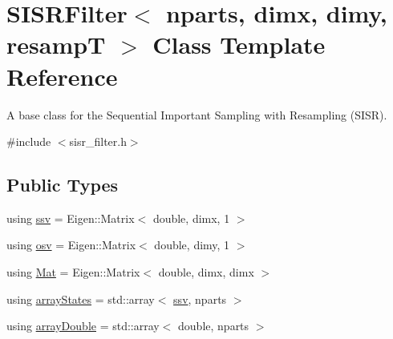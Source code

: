 \hypertarget{classSISRFilter}{}\section{S\+I\+S\+R\+Filter$<$ nparts, dimx, dimy, resampT $>$ Class Template Reference}
\label{classSISRFilter}


A base class for the Sequential Important Sampling with Resampling (S\+I\+SR).  




{\ttfamily \#include $<$sisr\+\_\+filter.\+h$>$}

\subsection*{Public Types}
\begin{DoxyCompactItemize}
\item 
using \hyperlink{classSISRFilter_aeaa3ff0465a0b260710a17238a95212c}{ssv} = Eigen\+::\+Matrix$<$ double, dimx, 1 $>$
\item 
using \hyperlink{classSISRFilter_ad3449fbd43f19dbda6b80459d729d9bf}{osv} = Eigen\+::\+Matrix$<$ double, dimy, 1 $>$
\item 
using \hyperlink{classSISRFilter_a6563da123e66df0b1140140a5b40d535}{Mat} = Eigen\+::\+Matrix$<$ double, dimx, dimx $>$
\item 
using \hyperlink{classSISRFilter_aea07f74ad2073e48134a1b8130a1e2cf}{array\+States} = std\+::array$<$ \hyperlink{classSISRFilter_aeaa3ff0465a0b260710a17238a95212c}{ssv}, nparts $>$
\item 
using \hyperlink{classSISRFilter_a6925bb8edf01ea99ddcff65b277cb72c}{array\+Double} = std\+::array$<$ double, nparts $>$
\end{DoxyCompactItemize}
